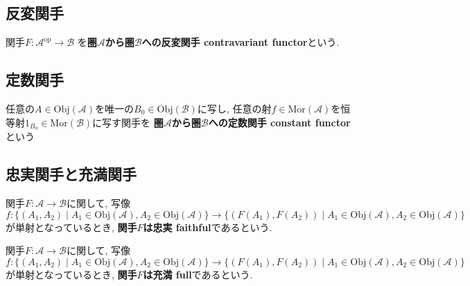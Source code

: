 \subsection{反変関手}
\begin{Def}
関手$F:\mathscr{A}^{\mathrm{op}}\rightarrow\mathscr{B}$
を{\bf 圏$\mathscr{A}$から圏$\mathscr{B}$への反変関手 contravariant functor}という.
\end{Def}
\subsection{定数関手}
\begin{Def}
任意の$A\in\mathrm{Obj}(\mathscr{A})$を唯一の$B_0\in\mathrm{Obj}(\mathscr{B})$に写し,
任意の射$f\in\mathrm{Mor}(\mathscr{A})$を恒等射$1_{B_0}\in\mathrm{Mor}(\mathscr{B})$に写す関手を
{\bf 圏$\mathscr{A}$から圏$\mathscr{B}$への定数関手 constant functor}という
\end{Def}

\subsection{忠実関手と充満関手}
\begin{Def}
関手$F:\mathscr{A}\rightarrow\mathscr{B}$に関して,
写像
\[f:\{(A_1,A_2)\mid A_1\in\mathrm{Obj}(\mathscr{A}),A_2\in\mathrm{Obj}(\mathscr{A})\}\rightarrow\{(F(A_1),F(A_2))\mid A_1\in\mathrm{Obj}(\mathscr{A}),A_2\in\mathrm{Obj}(\mathscr{A})\}\]
が単射となっているとき,
{\bf 関手$F$は忠実 faithful}であるという.
\end{Def}
\begin{Def}
関手$F:\mathscr{A}\rightarrow\mathscr{B}$に関して,
写像
\[f:\{(A_1,A_2)\mid A_1\in\mathrm{Obj}(\mathscr{A}),A_2\in\mathrm{Obj}(\mathscr{A})\}\rightarrow\{(F(A_1),F(A_2))\mid A_1\in\mathrm{Obj}(\mathscr{A}),A_2\in\mathrm{Obj}(\mathscr{A})\}\]
が単射となっているとき,
{\bf 関手$F$は充満 full}であるという.
\end{Def}


